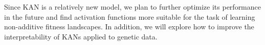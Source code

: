 \documentclass{article}
\begin{document}
Since KAN is a relatively new model, we plan to further optimize its performance in the future and find activation functions more suitable for the task of learning non-additive fitness landscapes. In addition, we will explore how to improve the interpretability of KANs applied to genetic data.




\printbibliography 
\end{document}
